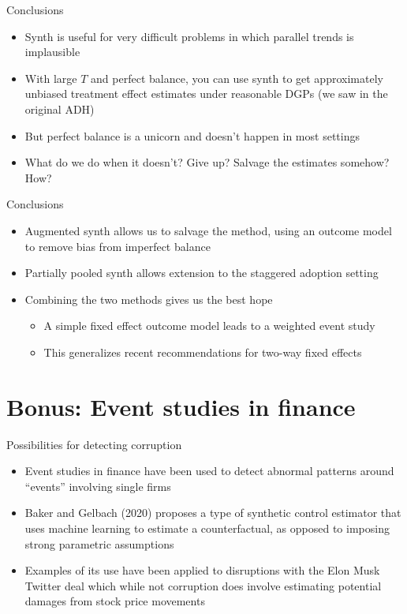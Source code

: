 \documentclass{beamer}
\begin{document}
\begin{frame}{Conclusions}

\begin{itemize}
\item Synth is useful for very difficult problems in which parallel trends is implausible
\item With large $T$ and perfect balance, you can use synth to get approximately unbiased treatment effect estimates under reasonable DGPs (we saw in the original ADH)
\item But perfect balance is a unicorn and doesn't happen in most settings
\item What do we do when it doesn't?  Give up?  Salvage the estimates somehow? How?
\end{itemize}

\end{frame}


\begin{frame}{Conclusions}

\begin{itemize}
\item Augmented synth allows us to salvage the method, using an outcome model to remove bias from imperfect balance
\item Partially pooled synth allows extension to the staggered adoption setting
\item Combining the two methods gives us the best hope 
	\begin{itemize}
	\item A simple fixed effect outcome model leads to a weighted event study
	\item This generalizes recent recommendations for two-way fixed effects
	\end{itemize}
\end{itemize}

\end{frame}





\section{Bonus: Event studies in finance}

\begin{frame}{Possibilities for detecting corruption}

\begin{itemize}

\item Event studies in finance have been used to detect abnormal patterns around ``events'' involving single firms
\item Baker and Gelbach (2020) proposes a type of synthetic control estimator that uses machine learning to estimate a counterfactual, as opposed to imposing strong parametric assumptions
\item Examples of its use have been applied to disruptions with the Elon Musk Twitter deal which while not corruption does involve estimating potential damages from stock price movements

\end{itemize}

\end{frame}
\end{document}
